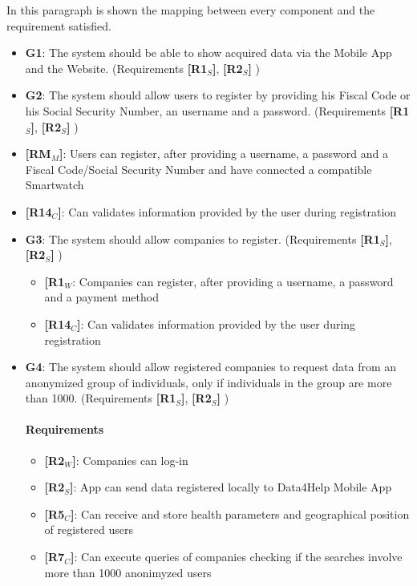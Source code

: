 In this paragraph is shown the mapping between every component and the requirement satisfied.


\begin{itemize}
    \item \textbf{G1}: The system should be able to show acquired data via the Mobile App and the Website. (Requirements \textbf{[R1$_S$]}, \textbf{[R2$_S$]} )
        

    \item \textbf{G2}: The system should allow users to register by providing his Fiscal Code or his Social Security Number, an username and a password. (Requirements \textbf{[R1$_S$]}, \textbf{[R2$_S$]} )
  
    \item \textbf{[RM$_M$]}: Users can register, after providing a username, a password and a Fiscal Code/Social Security Number and have connected a compatible Smartwatch
    \item \textbf{[R14$_C$]}: Can validates information provided by the user during registration


    \item \textbf{G3}: The system should allow companies to register. (Requirements \textbf{[R1$_S$]}, \textbf{[R2$_S$]} )
    
    
   \begin{itemize}
    \item \textbf{[R1$_W$}: Companies can register, after providing a username, a password and a payment method
    \item \textbf{[R14$_C$]}: Can validates information provided by the user during registration
   \end{itemize}
   
   
    \item \textbf{G4}: The system should allow registered companies to request data from an anonymized group of individuals, only if individuals in the group are more than 1000. (Requirements \textbf{[R1$_S$]}, \textbf{[R2$_S$]} )
    \paragraph{Requirements}
   \begin{itemize}
    \item \textbf{[R2$_W$]}: Companies can log-in
    \item \textbf{[R2$_S$]}: App can send data registered locally to Data4Help Mobile App
    \item \textbf{[R5$_C$]}: Can receive and store health parameters and geographical position of registered users
    \item \textbf{[R7$_C$]}: Can execute queries of companies checking if the searches involve more than 1000 anonimyzed users
   \end{itemize}
   

\end{itemize}
